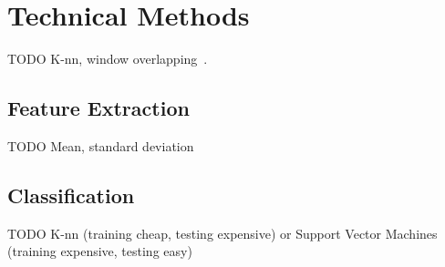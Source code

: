 \chapter{Technical Methods}
\label{sec:technical-methods}
TODO K-nn, window overlapping~\cite{ravi2005activity}.

\section{Feature Extraction}
\label{sec:feature-extraction}
TODO Mean, standard deviation

\section{Classification}
\label{sec:classification}
TODO K-nn (training cheap, testing expensive) or Support Vector Machines (training expensive, testing easy)
